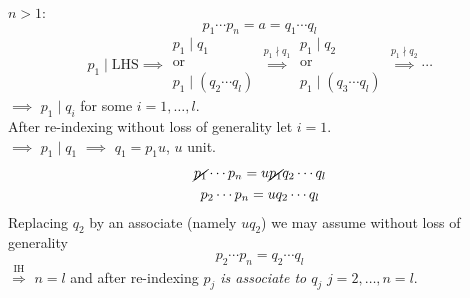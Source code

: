 $n>1$:
\[ p_1\dotsm p_n = a = q_1\dotsm q_l \]
\[ p_1\mid\text{LHS} \implies
\begin{gathered}
p_1\mid q_1 \\
\text{or} \\
p_1\mid(q_2\dotsm q_l)
\end{gathered} \overset{p_1\nmid q_1}\implies
\begin{gathered}
p_1\mid q_2 \\
\text{or} \\
p_1\mid(q_3\dotsm q_l)
\end{gathered} \overset{p_1\nmid q_2}\implies \dotsb \]
$\implies$ $p_1\mid q_i$ for some $i=1,\dotsc,l$. \\
After re-indexing without loss of generality let $i=1$. \\
$\implies$ $p_1\mid q_1$ $\implies$ $q_1=p_1u$, $u$ unit.
\begin{gather*}
\cancel{p_1} \dotsm p_n = u \cancel{p_1} q_2 \dotsm q_l \\
p_2 \dotsm p_n = u q_2 \dotsm q_l
\end{gather*}
Replacing $q_2$ by an associate (namely $uq_2$) we may assume without loss of generality
\[ p_2\dotsm p_n = q_2\dotsm q_l \]
$\overset{\text{IH}}\Longrightarrow$ $n=l$ and after re-indexing \emph{$p_j$ is associate to $q_j$} $j=2,\dotsc,n=l$.

